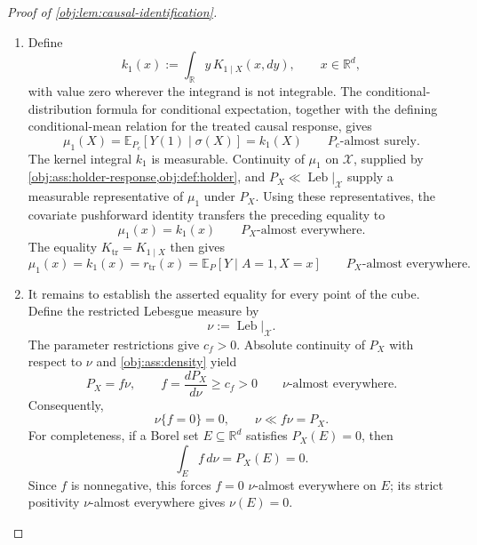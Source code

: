 \documentclass[11pt]{article}
\begin{document}
\begin{proof}[Proof of \cref{obj:lem:causal-identification}]
\begin{enumerate}
The choices \(\lambda=1\) and \(\lambda=-1\) control the absolute first moment. Indeed, for every \(y\in\mathbb R\),
\[
1+|y-r_{\mathrm{tr}}(x)|
\le e^{|y-r_{\mathrm{tr}}(x)|}
\le e^{y-r_{\mathrm{tr}}(x)}
   +e^{-(y-r_{\mathrm{tr}}(x))},
\]
so
\[
|y|
\le |y-r_{\mathrm{tr}}(x)|+|r_{\mathrm{tr}}(x)|
\le e^{y-r_{\mathrm{tr}}(x)}
   +e^{-(y-r_{\mathrm{tr}}(x))}
   +|r_{\mathrm{tr}}(x)|.
\]
The right-hand side is integrable under \(K_{1\mid X}(x)\). Integrating the inequality and using the exponential bounds yields
\[
\begin{aligned}
\int_{\mathbb R}|y|\,K_{1\mid X}(x,dy)
&\le
\int_{\mathbb R}e^{y-r_{\mathrm{tr}}(x)}\,K_{1\mid X}(x,dy)
+\int_{\mathbb R}e^{-(y-r_{\mathrm{tr}}(x))}\,K_{1\mid X}(x,dy)
+|r_{\mathrm{tr}}(x)|\\
&\le 2e^{B^2/2}+B.
\end{aligned}
\]
This bound is uniform on a set of full \(P_X\)-measure. Disintegration therefore gives
\[
\int |Y(1)|\,dP_c
=
\int_{\mathbb R^d}
\left(\int_{\mathbb R}|y|\,K_{1\mid X}(x,dy)\right)P_X(dx)
\le 2e^{B^2/2}+B<\infty.
\]
In particular, \(Y(1)\) is integrable under \(P_c\).

\item Define
\[
k_1(x):=\int_{\mathbb R}y\,K_{1\mid X}(x,dy),
\qquad x\in\mathbb R^d,
\]
with value zero wherever the integrand is not integrable. The conditional-distribution formula for conditional expectation, together with the defining conditional-mean relation for the treated causal response, gives
\[
\mu_1(X)
=\mathbb E_{P_c}[Y(1)\mid\sigma(X)]
=k_1(X)
\qquad P_c\text{-almost surely}.
\]
The kernel integral \(k_1\) is measurable. Continuity of \(\mu_1\) on \(\mathcal X\), supplied by
\cref{obj:ass:holder-response,obj:def:holder}, and
\(P_X\ll\operatorname{Leb}|_{\mathcal X}\) supply a measurable representative of \(\mu_1\) under \(P_X\). Using these representatives, the covariate pushforward identity transfers the preceding equality to
\[
\mu_1(x)=k_1(x)
\qquad P_X\text{-almost everywhere}.
\]
The equality \(K_{\mathrm{tr}}=K_{1\mid X}\) then gives
\[
\mu_1(x)
=k_1(x)
=r_{\mathrm{tr}}(x)
=\mathbb E_P[Y\mid A=1,X=x]
\qquad P_X\text{-almost everywhere}.
\]

\item It remains to establish the asserted equality for every point of the cube. Define the restricted Lebesgue measure by
\[
\nu:=\operatorname{Leb}|_{\mathcal X}.
\]
The parameter restrictions give \(c_f>0\). Absolute continuity of \(P_X\) with respect to \(\nu\) and \cref{obj:ass:density} yield
\[
P_X=f\nu,
\qquad
f=\frac{dP_X}{d\nu}\ge c_f>0
\qquad \nu\text{-almost everywhere}.
\]
Consequently,
\[
\nu\{f=0\}=0,
\qquad
\nu\ll f\nu=P_X.
\]
For completeness, if a Borel set \(E\subseteq\mathbb R^d\) satisfies \(P_X(E)=0\), then
\[
\int_E f\,d\nu=P_X(E)=0.
\]
Since \(f\) is nonnegative, this forces \(f=0\) \(\nu\)-almost everywhere on \(E\); its strict positivity \(\nu\)-almost everywhere gives \(\nu(E)=0\).


\end{enumerate}
\end{proof}
\end{document}

